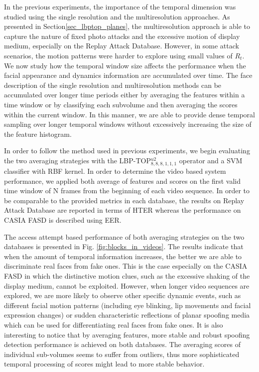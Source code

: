 In the previous experiments, the importance of the temporal dimension was studied using the single resolution and the multiresolution approaches. As presented in Section\ref{sec_lbptop_planes}, the multiresolution approach is able to capture the nature of fixed photo attacks and the excessive motion of display medium, especially on the Replay Attack Database. However, in some attack scenarios, the motion patterns were harder to explore using small values of $R_t$. We now study how the temporal window size affects the performance when the facial appearance and dynamics information are accumulated over time. The face description of the single resolution and multiresolution methods can be accumulated over longer time periods either by averaging the features within a time window or by classifying each subvolume and then averaging the scores within the current window. In this manner, we are able to provide dense temporal sampling over longer temporal windows without excessively increasing the size of the feature histogram.

In order to follow the method used in previous experiments, we begin evaluating the two averaging strategies with the LBP-TOP$_{8,8,8,1,1,1}^{u2}$ operator and a SVM classifier with RBF kernel. In order to determine the video based system performance, we applied both average of features and scores on the first valid time window of N frames from the beginning of each video sequence. In order to be comparable to the provided metrics in each database, the results on Replay Attack Database are reported in terms of HTER whereas the performance on CASIA FASD is described using EER.


The access attempt based performance of both averaging strategies on the two databases is presented in Fig. \ref{fig:blocks_in_videos}. The results indicate that when the amount of temporal information increases, the better we are able to discriminate real faces from fake ones. This is the case especially on the CASIA FASD in which the distinctive motion clues, such as the excessive shaking of the display medium, cannot be exploited. However, when longer video sequences are explored, we are more likely to observe other specific dynamic events, such as different facial motion patterns (including eye blinking, lip movements and facial expression changes) or sudden characteristic reflections of planar spoofing media which can be used for differentiating real faces from fake ones. It is also interesting to notice that by averaging features, more stable and robust spoofing detection performance is achieved on both databases. The averaging scores of individual sub-volumes seems to suffer from outliers, thus more sophisticated temporal processing of scores might lead to more stable behavior.


